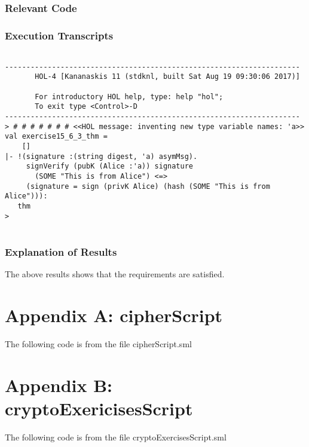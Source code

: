 \documentclass{report}
\begin{document}
\subsection{Relevant Code}
\label{sec:relevant-code-1a}



\subsection{Execution Transcripts}
\label{sec:exec-transcr-2a}

\setcounter{sessioncount}{0}
\begin{session}
  \begin{scriptsize}
\begin{verbatim}

---------------------------------------------------------------------
       HOL-4 [Kananaskis 11 (stdknl, built Sat Aug 19 09:30:06 2017)]

       For introductory HOL help, type: help "hol";
       To exit type <Control>-D
---------------------------------------------------------------------
> # # # # # # # <<HOL message: inventing new type variable names: 'a>>
val exercise15_6_3_thm =
    []
|- !(signature :(string digest, 'a) asymMsg).
     signVerify (pubK (Alice :'a)) signature
       (SOME "This is from Alice") <=>
     (signature = sign (privK Alice) (hash (SOME "This is from Alice"))):
   thm
> 
 
\end{verbatim}
  \end{scriptsize}
\end{session}


\subsection{Explanation of Results}
\label{sec:explanation-results-1}
The above results shows that the requirements are satisfied.



\chapter{Appendix A: cipherScript}
\label{cha:appendix-a:chapter15}

The following code is from the file cipherScript.sml


\chapter{Appendix B: cryptoExericisesScript }
\label{cha:appendix-a:chapter15}

The following code is from the file cryptoExercisesScript.sml

\end{document}
